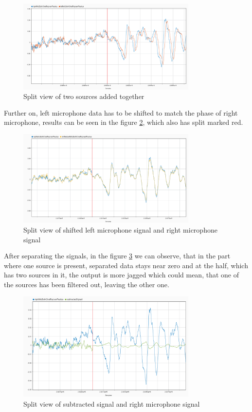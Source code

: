 \begin{figure}[htp]
	\centering
	\includegraphics[width=0.8\textwidth]{Illustrations/twoSourcesAndJustOneLater.png}
	\caption{Split view of two sources added together}
	\label{fig:SplitTwoSources}
\end{figure}
Further on, left microphone data has to be shifted to match the phase of right 
microphone, results can be seen in the figure \ref{fig:SplitShifted}, which also 
has split marked red.
\begin{figure}[htp]
	\centering
	\includegraphics[width=0.8\textwidth]{Illustrations/shiftedLeftAndRightSplitView.png}
	\caption{Split view of shifted left microphone signal and right microphone signal}
	\label{fig:SplitShifted}
\end{figure}
After separating the signals, in the figure \ref{fig:SplitSeparated} we can observe, 
that in the part where one source is present, separated data stays near zero and at 
the half, which has two sources in it, the output is more jagged which could mean, 
that one of the sources has been filtered out, leaving the other one.

\begin{figure}[htp]
	\centering
	\includegraphics[width=0.8\textwidth]{Illustrations/rightAndSubtractedSplitView.png}
	\caption{Split view of subtracted signal and right microphone signal}
	\label{fig:SplitSeparated}
\end{figure}

